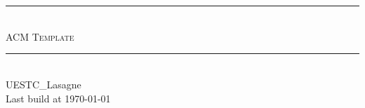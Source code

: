\documentclass[12pt,a4paper]{article}
\begin{document}
    \pagestyle{fancy}
    \lhead{} 
    \chead{} 
    \cfoot{}
    \rfoot{\bfseries\thepage} 
    \renewcommand{\headrulewidth}{0.4pt} 
    \renewcommand{\footrulewidth}{0.4pt}

    \begin{titlepage}
	~
	\clearpage
	\pagestyle{empty}
	
        \begin{center}
        ~\\[160pt]
        
        \hrule\ \\[8pt]
        \fontsize{48pt}{\baselineskip}\selectfont  \textsc{ACM Template}\\[8pt]
        \hrule\ \\[340pt]

        \huge UESTC\_Lasagne\\[8pt]
        \Large Last build at \today
        \end{center}
    \end{titlepage}

    \restoregeometry
    
    \tableofcontents
    \clearpage


    
    \clearpage

    
    \clearpage

    
    \clearpage

    
    \clearpage

    
    \clearpage

    
    \clearpage

    
    \clearpage
    
    
    \clearpage
    
    
    \clearpage
\end{document}
